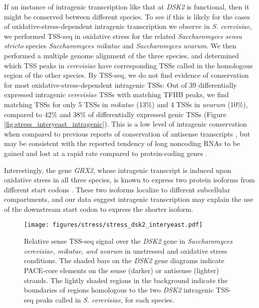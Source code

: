 If an instance of intragenic transcription like that at \textit{DSK2} is functional, then it might be conserved between different species.
To see if this is likely for the cases of oxidative-stress-dependent intragenic transcription we observe in \textit{S. cerevisiae}, we performed TSS-seq in oxidative stress for the related \textit{Saccharomyces sensu stricto} species \textit{Saccharomyces mikatae} and \textit{Saccharomyces uvarum}.
We then performed a multiple genome alignment of the three species, and determined which TSS peaks in \textit{cerevisiae} have corresponding TSSs called in the homologous region of the other species.
By TSS-seq, we do not find evidence of conservation for most oxidative-stress-dependent intragenic TSSs: Out of 39 differentially expressed intragenic \textit{cerevisiae} TSSs with matching TFIIB peaks, we find matching TSSs for only 5 TSSs in \textit{mikatae} (13\%) and 4 TSSs in \textit{uvarum} (10\%), compared to 42\% and 38\% of differentially expressed genic TSSs (Figure \ref{fig:stress_interyeast_intragenic}).
This is a low level of intragenic conservation when compared to previous reports of conservation of antisense transcripts \citep{yassour2010, rhind2011}, but may be consistent with the reported tendency of long noncoding RNAs to be gained and lost at a rapid rate compared to protein-coding genes \citep{kutter2012}.

Interestingly, the gene \textit{GRX2}, whose intragenic transcript is induced upon oxidative stress in all three species, is known to express two protein isoforms from different start codons \citep{pedrajas2002}.
These two isoforms localize to different subcellular compartments, and our data suggest intragenic transcription may explain the use of the downstream start codon to express the shorter isoform.

\begin{figure}[h]
    \texttt{[image: figures/stress/stress\_dsk2\_interyeast.pdf]}
    \caption[Sense TSS-seq signal over the \textit{DSK2} gene in \textit{Saccharomyces cerevisiae, mikatae, and uvarum} in unstressed and oxidative stress conditions.]{Relative sense TSS-seq signal over the \textit{DSK2} gene in \textit{Saccharomyces cerevisiae, mikatae, and uvarum} in unstressed and oxidative stress conditions. The shaded bars on the \textit{DSK2} gene diagrams indicate PACE-core elements on the sense (darker) or antisense (lighter) strands. The lightly shaded regions in the background indicate the boundaries of regions homologous to the two \textit{DSK2} intragenic TSS-seq peaks called in \textit{S. cerevisiae}, for each species.}
    \label{fig:stress_dsk2_interyeast}
\end{figure}

